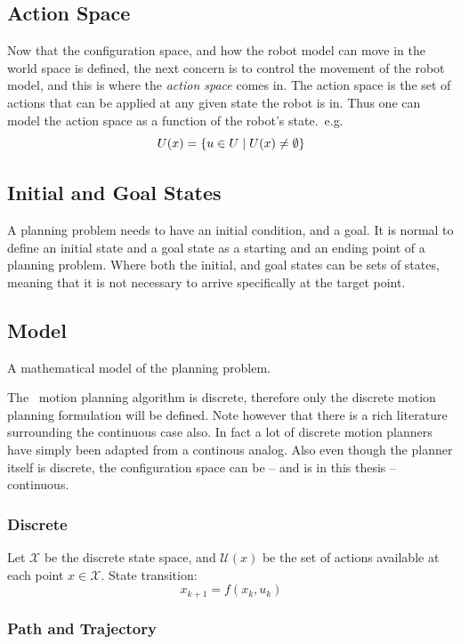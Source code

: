 \subsection{Action Space}

Now that the configuration space, and how the robot model can move in the world
space is defined, the next concern is to control the movement of the robot
model, and this is where the \textit{action space} comes in. The action space is
the set of actions that can be applied at any given state the robot is in. Thus
one can model the action space as a function of the robot's state.\ e.g.
\[
  U(x) = \lbrace u \in U \mid U(x)
    \neq \emptyset \rbrace
\]

\subsection{Initial and Goal States}

A planning problem needs to have an initial condition, and a goal. It is normal
to define an initial state and a goal state as a starting and an ending point of
a planning problem. Where both the initial, and goal states can be sets of
states, meaning that it is not necessary to arrive specifically at the target
point.

\subsection{Model}

A mathematical model of the planning problem.

The \rrtfunnel\ motion planning algorithm is discrete, therefore only the
discrete motion planning formulation will be defined. Note however that there is
a rich literature surrounding the continuous case also. In fact a lot of
discrete motion planners have simply been adapted from a continous analog. Also
even though the planner itself is discrete, the configuration space can be -- and
is in this thesis -- continuous.

\subsubsection{Discrete}

Let \(\mathcal{X}\) be the discrete state space, and \(\mathcal{U}(x)\) be the
set of actions available at each point \(x \in \mathcal{X}\). State transition:\
\[
  x_{k+1} = f(x_k, u_k)
\]

\subsubsection{Path and Trajectory}

